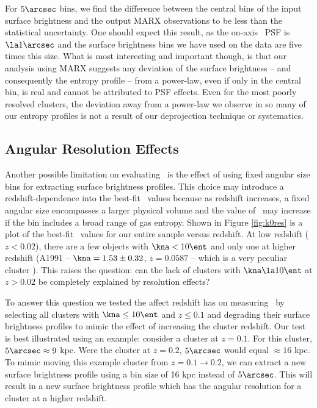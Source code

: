 \documentclass[apj]{emulateapj}
\begin{document}
For $5\arcsec$ bins, we find the difference between the central bins
of the input surface brightness and the output MARX observations to be
less than the statistical uncertainty. One should expect this result,
as the on-axis \chandra\ PSF is $\la 1\arcsec$ and the surface
brightness bins we have used on the data are five times this
size. What is most interesting and important though, is that our
analysis using MARX suggests any deviation of the surface brightness
-- and consequently the entropy profile -- from a power-law, even if
only in the central bin, is real and cannot be attributed to PSF
effects. Even for the most poorly resolved clusters, the deviation
away from a power-law we observe in so many of our entropy profiles is
not a result of our deprojection technique or systematics.

\subsection{Angular Resolution Effects}
\label{sec:angres}

Another possible limitation on evaluating \kna\ is the effect of using
fixed angular size bins for extracting surface brightness
profiles. This choice may introduce a redshift-dependence into the
best-fit \kna\ values because as redshift increases, a fixed angular
size encompasses a larger physical volume and the value of \kna\ may
increase if the bin includes a broad range of gas entropy. Shown in
Figure \ref{fig:k0res} is a plot of the best-fit \kna\ values for our
entire sample versus redshift. At low redshift ($z < 0.02$), there are
a few objects with $\kna < 10 \ent$ and only one at higher redshift
(A1991 -- $\kna = 1.53 \pm 0.32$, $z = 0.0587$ -- which is a very
peculiar cluster \citep{2004ApJ...613..180S}). This raises the
question: can the lack of clusters with $\kna \la 10 \ent$ at $z >
0.02$ be completely explained by resolution effects?

To answer this question we tested the affect redshift has on measuring
\kna\ by selecting all clusters with $\kna \leq 10 \ent$ and $z \leq
0.1$ and degrading their surface brightness profiles to mimic the
effect of increasing the cluster redshift. Our test is best
illustrated using an example: consider a cluster at $z = 0.1$. For
this cluster, $5\arcsec \approx 9$ kpc. Were the cluster at $z = 0.2$,
$5\arcsec$ would equal $\approx 16$ kpc. To mimic moving this example
cluster from $z = 0.1 \rightarrow 0.2$, we can extract a new surface
brightness profile using a bin size of 16 kpc instead of
$5\arcsec$. This will result in a new surface brightness profile which
has the angular resolution for a cluster at a higher redshift.
\end{document}
